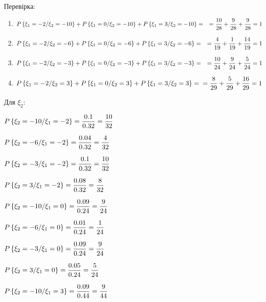 \documentclass[a4paper, 20pt, titlepage]{article}
\begin{document}
\begin{enumerate}
Перевірка:

\begin{spacing}{2}
\begin{enumerate}
\vspace{-4mm}
\item $P\left\{\xi_1 = -2 / \xi_2 = -10 \right\} + P\left\{\xi_1 = 0 / \xi_2 = -10 \right\} + P\left\{\xi_1 = 3 / \xi_2 = -10 \right\} = \quad= \displaystyle{\frac{10}{28} + \frac{9}{28} + \frac{9}{28}} = 1$ 

\item $P\left\{\xi_1 = -2 / \xi_2 = -6 \right\} + P\left\{\xi_1 = 0 / \xi_2 = -6 \right\} + P\left\{\xi_1 = 3 / \xi_2 = -6 \right\} = \quad= \displaystyle{\frac{4}{19} + \frac{1}{19} + \frac{14}{19}} = 1$ 
\vspace{2mm}

\item $P\left\{\xi_1 = -2 / \xi_2 = -3 \right\} + P\left\{\xi_1 = 0 / \xi_2 = -3 \right\} + P\left\{\xi_1 = 3 / \xi_2 = -3 \right\} = \quad= \displaystyle{\frac{10}{24} + \frac{9}{24} + \frac{5}{24}} = 1$ 
\vspace{2mm}

\item $P\left\{\xi_1 = -2 / \xi_2 = 3 \right\} + P\left\{\xi_1 = 0 / \xi_2 = 3 \right\} + P\left\{\xi_1 = 3 / \xi_2 = 3 \right\} = \\ = \displaystyle{\frac{8}{29} + \frac{5}{29} + \frac{16}{29}} = 1$ 
\vspace{2mm}
\end{enumerate}
\end{spacing}

\vspace{-10mm}
\begin{spacing}{2.3}
\item  Для $\xi_2$: 

$\displaystyle{P\left\{\xi_2 = -10 / \xi_1 = -2 \right\}  = \frac{0.1}{0.32}} = \frac{10}{32}$

$\displaystyle{P\left\{\xi_2 = -6 / \xi_1 = -2 \right\}  = \frac{0.04}{0.32}} = \frac{4}{32}$

$\displaystyle{P\left\{\xi_2 = -3 / \xi_1 = -2 \right\}  = \frac{0.1}{0.32}} = \frac{10}{32}$

$\displaystyle{P\left\{\xi_2 = 3 / \xi_1 = -2 \right\}  = \frac{0.08}{0.32}} = \frac{8}{32}$


$\displaystyle{P\left\{\xi_2 = -10 / \xi_1 = 0 \right\}  = \frac{0.09}{0.24}} = \frac{9}{24}$

$\displaystyle{P\left\{\xi_2 = -6 / \xi_1 = 0 \right\}  = \frac{0.01}{0.24}} = \frac{1}{24}$

$\displaystyle{P\left\{\xi_2 = -3 / \xi_1 = 0 \right\}  = \frac{0.09}{0.24}} = \frac{9}{24}$

$\displaystyle{P\left\{\xi_2 = 3 / \xi_1 = 0 \right\}  = \frac{0.05}{0.24}} = \frac{5}{24}$


$\displaystyle{P\left\{\xi_2 = -10 / \xi_1 = 3 \right\}  = \frac{0.09}{0.44}} = \frac{9}{44}$


\end{spacing}
\end{enumerate}
\end{document}
